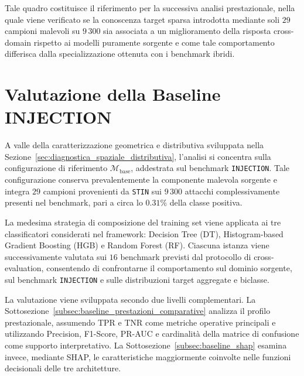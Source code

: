 Tale quadro costituisce il riferimento per la successiva analisi prestazionale, nella quale viene verificato se la conoscenza target sparsa introdotta mediante soli $29$ campioni malevoli su $9\,300$ sia associata a un miglioramento della risposta cross-domain rispetto ai modelli puramente sorgente e come tale comportamento differisca dalla specializzazione ottenuta con i benchmark ibridi.




\section{Valutazione della Baseline INJECTION}
\label{sec:baseline_prestazioni}

A valle della caratterizzazione geometrica e distributiva sviluppata nella Sezione~\ref{sec:diagnostica_spaziale_distributiva}, l'analisi si concentra sulla configurazione di riferimento $\mathcal{M}_{\mathrm{base}}$, addestrata sul benchmark \texttt{INJECTION}. 
Tale configurazione conserva prevalentemente la componente malevola sorgente e integra $29$ campioni provenienti da \texttt{STIN} sui $9\,300$ attacchi complessivamente presenti nel benchmark, pari a circa lo $0.31\%$ della classe positiva.

La medesima strategia di composizione del training set viene applicata ai tre classificatori considerati nel framework: Decision Tree (DT), Histogram-based Gradient Boosting (HGB) e Random Forest (RF). 
Ciascuna
istanza viene successivamente valutata sui $16$ benchmark previsti dal protocollo di cross-evaluation, consentendo di confrontarne il comportamento sul dominio sorgente, sul benchmark \texttt{INJECTION} e sulle distribuzioni target aggregate e biclasse.

La valutazione viene sviluppata secondo due livelli complementari. 
La Sottosezione~\ref{subsec:baseline_prestazioni_comparative} analizza il profilo prestazionale, assumendo TPR e TNR come metriche operative principali e utilizzando Precision, F1-Score, PR-AUC e cardinalità della matrice di confusione come supporto interpretativo. 
La Sottosezione~\ref{subsec:baseline_shap} esamina invece, mediante SHAP, le caratteristiche maggiormente coinvolte nelle funzioni decisionali delle tre architetture.


